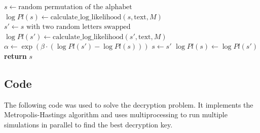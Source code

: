 \documentclass{article}
\begin{document}
\begin{algorithmic}[1]
    \State $s \gets \text{random permutation of the alphabet}$
    \State $\log Pl(s) \gets \text{calculate\_log\_likelihood}(s, \text{text}, M)$
        \State $s' \gets s \text{ with two random letters swapped}$
        \State $\log Pl(s') \gets \text{calculate\_log\_likelihood}(s', \text{text}, M)$
        \State $\alpha \gets \exp(\beta \cdot (\log Pl(s') - \log Pl(s)))$
            \State $s \gets s'$
            \State $\log Pl(s) \gets \log Pl(s')$
        \EndIf
    \EndFor
    \State \textbf{return} $s$
\EndProcedure
\end{algorithmic}

\subsection*{Code}
The following code was used to solve the decryption problem. It implements the Metropolis-Hastings algorithm and uses multiprocessing to run multiple simulations in parallel to find the best decryption key.
\end{document}
